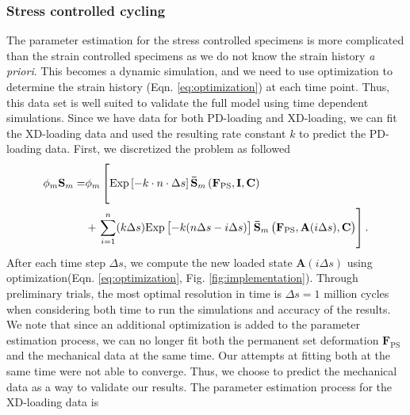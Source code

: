 \subsubsection{Stress controlled cycling}
The parameter estimation for the stress controlled specimens is more complicated than the strain controlled specimens as we do not know the strain history \textit{a priori}. This becomes a dynamic simulation, and we need to use optimization to determine the strain history (Eqn. \ref{eq:optimization}) at each time point. Thus, this data set is well suited to validate the full model using time dependent simulations. Since we have data for both PD-loading and XD-loading, we can fit the XD-loading data and used the resulting rate constant $k $ to predict the PD-loading data. First, we discretized the problem as followed
\begin{equation} 
\begin{aligned}
\phi_m \mathbf{S}_m =& \phi_m \left[\mathrm{Exp} \left[-k  \cdot n \cdot \Delta s \right] \mathbf{\bar{S}}_m \left(\mathbf{F}_\mathrm{PS}, \mathbf{I},\mathbf{C}\right)\vphantom{\sum_{i = 1}^n}\right. \\
&+ \left.\sum_{i = 1}^n  (k \Delta s) \mathrm{Exp}\left[-k (n\Delta s - i \Delta s)\right] \mathbf{\bar{S}}_m \left(\mathbf{F}_\mathrm{PS}, \mathbf{A}(i\Delta s),\mathbf{C}\right)\right].
\end{aligned}
\end{equation}
After each time step $\Delta s$, we compute the new loaded state $\mathbf{A}(i\Delta s)$ using optimization(Eqn. \ref{eq:optimization}, Fig. \ref{fig:implementation}). Through preliminary trials, the most optimal resolution in time is $\Delta s = 1$ million cycles when considering both time to run the simulations and accuracy of the results. We note that since an additional optimization is added to the parameter estimation process, we can no longer fit both the permanent set deformation $\mathbf{F}_\mathrm{PS}$ and the mechanical data at the same time. Our attempts at fitting both at the same time were not able to converge. Thus, we choose to predict the mechanical data as a way to validate our results. 
The parameter estimation process for the XD-loading data is
